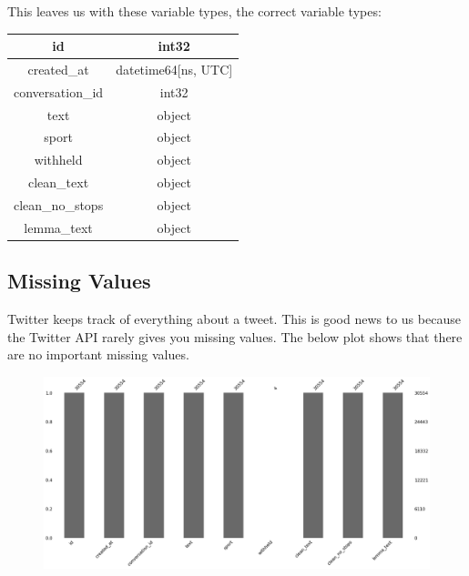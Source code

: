 \documentclass[12pt]{article}
\begin{document}
            This leaves us with these variable types, the correct variable types:

            \begin{center}
                \begin{tabular}{|c|c|}
                    \hline
                    id & int32\\
                    \hline
                    created\_at & datetime64[ns, UTC]\\
                    \hline
                    conversation\_id & int32\\
                    \hline
                    text & object\\
                    \hline
                    sport & object\\
                    \hline
                    withheld & object\\
                    \hline
                    clean\_text & object\\
                    \hline
                    clean\_no\_stops & object\\
                    \hline
                    lemma\_text & object\\
                    \hline
                \end{tabular}
            \end{center}
        \subsection{Missing Values}
            Twitter keeps track of everything about a tweet. This is good news to us because the Twitter API rarely gives you missing values. The below plot shows that there are no
            important missing values.

            \begin{figure}[H]
                \centering
                \includegraphics[scale=0.33]{missing.png}
            \end{figure}
\end{document}
